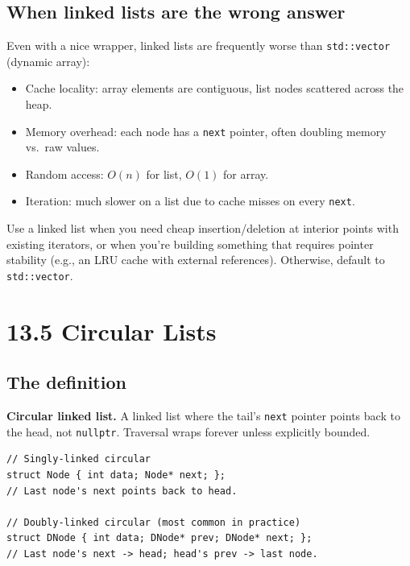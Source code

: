 \documentclass[11pt]{article}
\begin{document}
\subsection*{When linked lists are the wrong answer}

Even with a nice wrapper, linked lists are frequently worse than \texttt{std::vector} (dynamic array):

\begin{itemize}[leftmargin=*]
    \item Cache locality: array elements are contiguous, list nodes scattered across the heap.
    \item Memory overhead: each node has a \texttt{next} pointer, often doubling memory vs.\ raw values.
    \item Random access: $O(n)$ for list, $O(1)$ for array.
    \item Iteration: much slower on a list due to cache misses on every \texttt{next}.
\end{itemize}

Use a linked list when you need cheap insertion/deletion at interior points with existing iterators, or when you're building something that requires pointer stability (e.g., an LRU cache with external references). Otherwise, default to \texttt{std::vector}.

\section{13.5 Circular Lists}

\subsection*{The definition}

\begin{defnbox}
\textbf{Circular linked list.} A linked list where the tail's \texttt{next} pointer points back to the head, not \texttt{nullptr}. Traversal wraps forever unless explicitly bounded.
\end{defnbox}

\begin{lstlisting}[basicstyle=\ttfamily\small,frame=single]
// Singly-linked circular
struct Node { int data; Node* next; };
// Last node's next points back to head.

// Doubly-linked circular (most common in practice)
struct DNode { int data; DNode* prev; DNode* next; };
// Last node's next -> head; head's prev -> last node.
\end{lstlisting}
\end{document}
